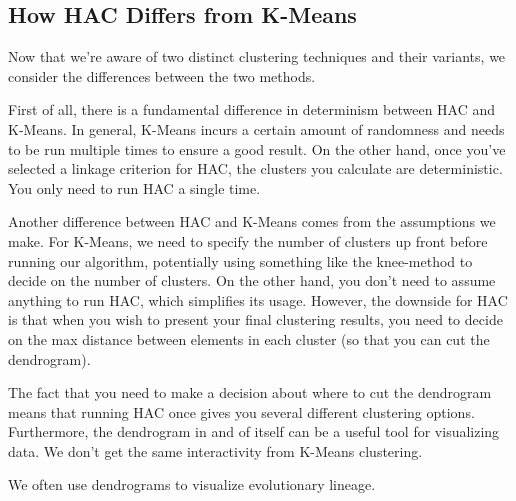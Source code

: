 \subsection{How HAC Differs from K-Means}
Now that we're aware of two distinct clustering techniques and their variants, we consider the differences between the two methods.

First of all, there is a fundamental difference in determinism between HAC and K-Means. In general, K-Means incurs a certain amount of randomness and needs to be run multiple times to ensure a good result. On the other hand, once you've selected a linkage criterion for HAC, the clusters you calculate are deterministic. You only need to run HAC a single time.

Another difference between HAC and K-Means comes from the assumptions we make. For K-Means, we need to specify the number of clusters up front before running our algorithm, potentially using something like the knee-method to decide on the number of clusters. On the other hand, you don't need to assume anything to run HAC, which simplifies its usage. However, the downside for HAC is that when you wish to present your final clustering results, you need to decide on the max distance between elements in each cluster (so that you can cut the dendrogram).

The fact that you need to make a decision about where to cut the dendrogram means that running HAC once gives you several different clustering options. Furthermore, the dendrogram in and of itself can be a useful tool for visualizing data. We don't get the same interactivity from K-Means clustering.

\begin{warning}
    We often use dendrograms to visualize evolutionary lineage.
\end{warning}